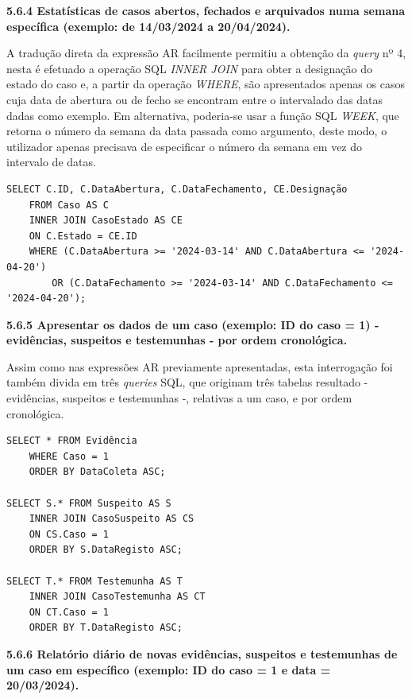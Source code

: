 \documentclass[a4paper,12pt]{scrreprt}
\begin{document}
{\large\textbf{5.6.4 Estatísticas de casos abertos, fechados e arquivados numa semana específica (exemplo: de 14/03/2024 a 20/04/2024).}}

A tradução direta da expressão AR facilmente permitiu a obtenção da \textit{query} nº 4, nesta é efetuado a operação SQL \textit{INNER JOIN} para obter a designação do estado do caso e, a partir da operação \textit{WHERE}, são apresentados apenas os casos cuja data de abertura ou de fecho se encontram entre o intervalado das datas dadas como exemplo. Em alternativa, poderia-se usar a função SQL \textit{WEEK}, que retorna o número da semana da data passada como argumento, deste modo, o utilizador apenas precisava de especificar o número da semana em vez do intervalo de datas.

\vspace{0.4cm}
\begin{lstlisting}[escapechar=!]
SELECT C.ID, C.DataAbertura, C.DataFechamento, CE.Designação
	FROM Caso AS C
    INNER JOIN CasoEstado AS CE
    ON C.Estado = CE.ID
	WHERE (C.DataAbertura >= '2024-03-14' AND C.DataAbertura <= '2024-04-20')
		OR (C.DataFechamento >= '2024-03-14' AND C.DataFechamento <= '2024-04-20');
\end{lstlisting}

{\large\textbf{5.6.5 Apresentar os dados de um caso (exemplo: ID do caso = 1) - evidências, suspeitos e testemunhas - por ordem cronológica.}}

Assim como nas expressões AR previamente apresentadas, esta interrogação foi também divida em três \textit{queries} SQL, que originam três tabelas resultado - evidências, suspeitos e testemunhas -, relativas a um caso, e por ordem cronológica.

\vspace{0.4cm}
\begin{lstlisting}[escapechar=!]
SELECT * FROM Evidência
	WHERE Caso = 1
	ORDER BY DataColeta ASC;

SELECT S.* FROM Suspeito AS S
	INNER JOIN CasoSuspeito AS CS
    ON CS.Caso = 1
    ORDER BY S.DataRegisto ASC;

SELECT T.* FROM Testemunha AS T
	INNER JOIN CasoTestemunha AS CT
    ON CT.Caso = 1
    ORDER BY T.DataRegisto ASC;
\end{lstlisting}

\clearpage

{\large\textbf{5.6.6 Relatório diário de novas evidências, suspeitos e testemunhas de um caso em específico (exemplo: ID do caso = 1 e data = 20/03/2024).}}
\end{document}
